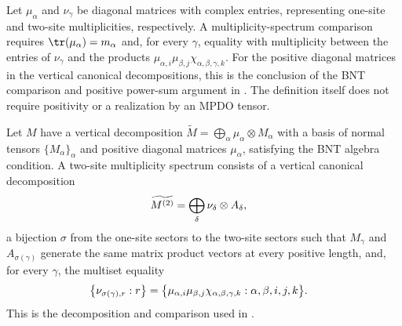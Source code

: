 \begin{definition}%
    \label{def:mpdo_bnt_multiplicity_spectrum_comparison}
    \leanok
    Let $\mu_\alpha$ and $\nu_\gamma$ be diagonal matrices with complex
    entries, representing one-site and two-site multiplicities, respectively.
    A multiplicity-spectrum comparison requires
    $\tr(\mu_\alpha)=m_\alpha$ and, for every $\gamma$, equality with
    multiplicity between the entries of $\nu_\gamma$ and the products
    $\mu_{\alpha,i}\mu_{\beta,j}\chi_{\alpha,\beta,\gamma,k}$.
    For the positive diagonal matrices in the vertical canonical
    decompositions, this is the conclusion of the BNT comparison and positive
    power-sum argument in
    \cite[Appendix~C.4, lines~2048--2058]{Cirac2016MPDO_arXiv}.
    The definition itself does not require positivity or a realization by
    an MPDO tensor.
\end{definition}

\begin{definition}%
    \label{def:mpdo_bnt_two_site_multiplicity_spectrum}
    \leanok
    Let $M$ have a vertical decomposition
    $\widetilde M=\bigoplus_\alpha\mu_\alpha\otimes M_\alpha$
    with a basis of normal tensors $\{M_\alpha\}_\alpha$ and positive diagonal matrices
    $\mu_\alpha$, satisfying the BNT algebra condition.
    A two-site multiplicity spectrum consists of a vertical canonical
    decomposition
    \begin{align}
        \widetilde{M^{(2)}}
         & =\bigoplus_\delta \nu_\delta\otimes A_\delta,
        \notag
    \end{align}
    a bijection $\sigma$ from the one-site sectors to the two-site sectors such
    that $M_\gamma$ and $A_{\sigma(\gamma)}$ generate the same matrix product
    vectors at every positive length, and, for every $\gamma$, the multiset
    equality
    \begin{align}
        \bigl\{\nu_{\sigma(\gamma),r}:r\bigr\}
         & =
        \bigl\{\mu_{\alpha,i}\mu_{\beta,j}
        \chi_{\alpha,\beta,\gamma,k}:\alpha,\beta,i,j,k\bigr\}.
        \notag
    \end{align}
    This is the decomposition and comparison used in
    \cite[Appendix~C.4, lines~2046--2058]{Cirac2016MPDO_arXiv}.
\end{definition}

